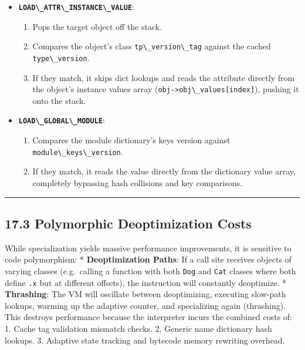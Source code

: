 \begin{itemize}
\tightlist
\item
  \textbf{\passthrough{\lstinline!LOAD\_ATTR\_INSTANCE\_VALUE!}}:

  \begin{enumerate}
  \def\labelenumi{\arabic{enumi}.}
  \tightlist
  \item
    Pops the target object off the stack.
  \item
    Compares the object's class
    \passthrough{\lstinline!tp\_version\_tag!} against the cached
    \passthrough{\lstinline!type\_version!}.
  \item
    If they match, it skips dict lookups and reads the attribute
    directly from the object's instance values array
    (\passthrough{\lstinline!obj->obj\_values[index]!}), pushing it onto
    the stack.
  \end{enumerate}
\item
  \textbf{\passthrough{\lstinline!LOAD\_GLOBAL\_MODULE!}}:

  \begin{enumerate}
  \def\labelenumi{\arabic{enumi}.}
  \tightlist
  \item
    Compares the module dictionary's keys version against
    \passthrough{\lstinline!module\_keys\_version!}.
  \item
    If they match, it reads the value directly from the dictionary value
    array, completely bypassing hash collisions and key comparisons.
  \end{enumerate}
\end{itemize}

\begin{center}\rule{0.5\linewidth}{0.5pt}\end{center}

\hypertarget{polymorphic-deoptimization-costs}{%
\subsection{17.3 Polymorphic Deoptimization
Costs}\label{polymorphic-deoptimization-costs}}

While specialization yields massive performance improvements, it is
sensitive to code polymorphism: * \textbf{Deoptimization Paths}: If a
call site receives objects of varying classes (e.g.~calling a function
with both \passthrough{\lstinline!Dog!} and
\passthrough{\lstinline!Cat!} classes where both define
\passthrough{\lstinline!.x!} but at different offsets), the instruction
will constantly deoptimize. * \textbf{Thrashing}: The VM will oscillate
between deoptimizing, executing slow-path lookups, warming up the
adaptive counter, and specializing again (thrashing). This destroys
performance because the interpreter incurs the combined costs of: 1.
Cache tag validation mismatch checks. 2. Generic name dictionary hash
lookups. 3. Adaptive state tracking and bytecode memory rewriting
overhead.

